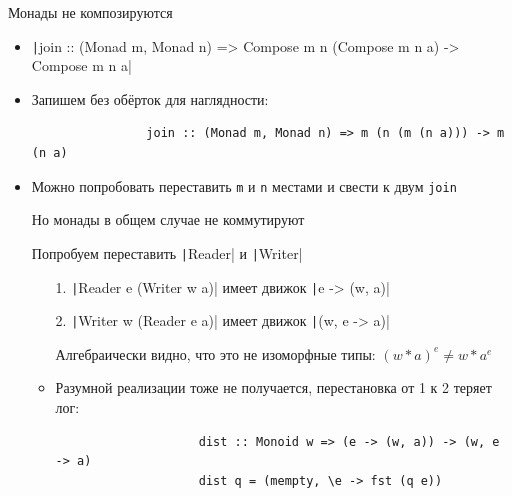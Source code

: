     \begin{frame}[fragile]{Монады не композируются}
        \vspace{-0.5em}
        \begin{itemize}
            \item \texttt|join :: (Monad m, Monad n) => Compose m n (Compose m n a) -> Compose m n a|
            \item Запишем без обёрток для наглядности: \pause
            \begin{verbatim}
                join :: (Monad m, Monad n) => m (n (m (n a))) -> m (n a)
            \end{verbatim}
            \item Можно попробовать переставить \texttt{m} и \texttt{n} местами и свести к двум \texttt{join}
            \item[\NB] Но монады в общем случае не коммутируют
            \item[\eg] Попробуем переставить \texttt|Reader| и \texttt|Writer|
            \begin{itemize}
                \item[1.] \texttt|Reader e (Writer w a)| имеет движок \texttt|e -> (w, a)|
                \item[2.] \texttt|Writer w (Reader e a)| имеет движок \texttt|(w, e -> a)|
                \item[\advanced] Алгебраически видно, что это не изоморфные типы: $(w * a)^e \neq w * a ^ e$
                \item Разумной реализации тоже не получается, перестановка от 1 к 2 теряет лог:
                \begin{verbatim}
                    dist :: Monoid w => (e -> (w, a)) -> (w, e -> a)
                    dist q = (mempty, \e -> fst (q e))
                \end{verbatim}
            \end{itemize}
        \end{itemize}
    \end{frame}


